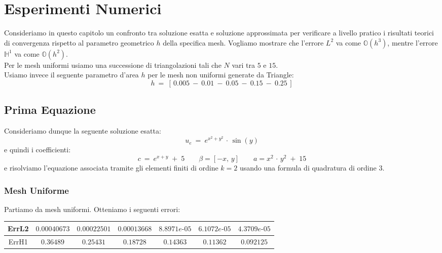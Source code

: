 \documentclass[12pt,a4paper]{report}
\theoremstyle{theorem}
\theoremstyle{theorem}
\theoremstyle{definition}
\begin{document}
\chapter{Esperimenti Numerici}
Consideriamo in questo capitolo un confronto tra soluzione esatta e soluzione approssimata per verificare a livello pratico i risultati teorici di convergenza rispetto al parametro geometrico $h$ della specifica mesh. Vogliamo mostrare che l'errore $L^{2}$ va come  $\mathbb{O}(h^{3})$, mentre l'errore $\mathbb{H}^{1}$ va come  $\mathbb{O}(h^{2})$. \\
Per le mesh uniformi usiamo una successione di triangolazioni tali che $N$ vari tra $5$ e $15$.\\
Usiamo invece il seguente parametro d'area $h$ per le mesh non uniformi generate da Triangle:
\[ 
h \ = \ [ \, 0.005 \ - \ 0.01 \ - \ 0.05 \ - \ 0.15 \ - \ 0.25 \, ] 
\]

\section{Prima Equazione}
Consideriamo dunque la seguente soluzione esatta:
\[ u_e \ = \ e^{x^{2} + y^{2}} \, \cdot \, \sin(y)\]
e quindi i coefficienti:
\[ c \ = \ e^{x + y} \; + \; 5 \qquad \beta = [-x, \, y] \qquad a = x^{2} \, \cdot \, y^{2} \; + \; 15 \]
e risolviamo l'equazione associata tramite gli elementi finiti di ordine $k = 2$ usando una formula di quadratura di ordine $3$. 

\subsection{Mesh Uniforme}
Partiamo da mesh uniformi. Otteniamo i seguenti errori:
\hfill \\
\begin{table}[!h]
\centering
\begin{tabular}{ | c | c | c | c | c | c | c | }
\hline
ErrL2	&	$0.00040673$ & $0.00022501$ & $0.00013668$ & $8.8971e\text{-}05$  & $6.1072e\text{-}05$ & $4.3709e\text{-}05$ \\ \hline 
ErrH1	&	$0.36489$ &	$0.25431$	 & $0.18728$	 & $0.14363$ & $0.11362$ & $0.092125$ \\ \hline 
\end{tabular}
\end{table}
\end{document}
